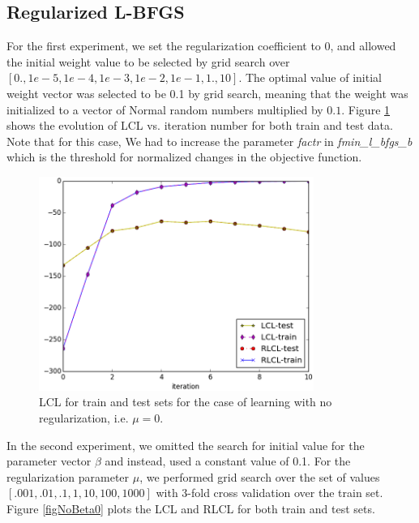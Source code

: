 \documentclass[twoside,12pt]{article}
\begin{document}
\subsection{ Regularized L-BFGS}
For the first experiment, we set the regularization coefficient to 0, and allowed the initial weight value to be selected by grid search over $[0.,1e-5,1e-4,1e-3,1e-2,1e-1,1.,10]$. The optimal value of initial weight vector was selected to be 0.1 by grid search, meaning that the weight was initialized to a vector of Normal random numbers multiplied by $0.1$. Figure \ref{figNoReg} shows the evolution of LCL vs. iteration number for both train and test data. Note that for this case, We had to increase the parameter {\it factr} in {\it fmin\_l\_bfgs\_b} which is the threshold for normalized changes in the objective function.
\begin{figure}[h!]
\label{figNoReg}
\centering
\includegraphics[width=0.8\textwidth]{noreg.png}
\caption{LCL for train and test sets for the case of learning with no regularization, i.e. $\mu=0$.}
\end{figure}
In the second experiment, we omitted the search for initial value for the parameter vector $\beta$ and instead, used a constant value of 0.1. For the regularization parameter $\mu$, we performed grid search over the set of values $[.001,.01,.1,1,10,100,1000]$ with 3-fold cross validation over the train set. Figure {\ref{figNoBeta0}} plots the LCL and RLCL for both train and test sets.
\end{document}
